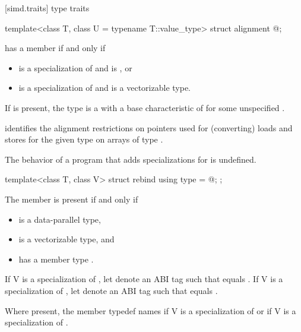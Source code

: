[simd.traits]{ type traits}

\begin{itemdecl}
template<class T, class U = typename T::value_type> struct alignment { @\seebelow@ };
\end{itemdecl}

\begin{itemdescr}
\pnum
{} has a member  if and only if
\begin{itemize}
 \item
    is a specialization of  and  is
   , or
 \item
    is a specialization of  and  is a
   vectorizable type.
\end{itemize}

\pnum
If  is present, the type  is a
 with a base characteristic of
 for some unspecified
.
\begin{note}
 identifies the alignment restrictions on pointers used for
(converting) loads and stores for the given type  on arrays of type
.
\end{note}

\pnum
The behavior of a program that adds specializations for 
is undefined.
\end{itemdescr}

\begin{itemdecl}
template<class T, class V> struct rebind { using type = @\seebelow@; };
\end{itemdecl}

\begin{itemdescr}
\pnum
The member  is present if and only if
\begin{itemize}
\item {} is a data-parallel type,
\item {} is a vectorizable type, and
\item {} has a member type
  .
\end{itemize}

\pnum
If \tcode V is a specialization of , let  denote
an ABI tag such that  equals
.
If \tcode V is a specialization of , let 
denote an ABI tag such that  equals .

\pnum
Where present, the member typedef  names 
if \tcode V is a specialization of  or
 if \tcode V is a specialization of
.
\end{itemdescr}

